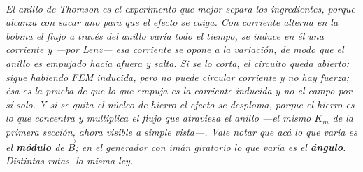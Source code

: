 \begin{center}
\begin{tikzpicture}[scale=1]
\end{tikzpicture}\\[0.5em]
{\small\itshape El anillo de Thomson es el experimento que mejor separa los
ingredientes, porque alcanza con sacar uno para que el efecto se caiga. Con
corriente alterna en la bobina el flujo a través del anillo varía todo el
tiempo, se induce en él una corriente y ---por Lenz--- esa corriente se opone a
la variación, de modo que el anillo es empujado hacia afuera y salta. Si se lo
corta, el circuito queda abierto: sigue habiendo FEM inducida, pero \emph{no
puede circular corriente} y no hay fuerza; ésa es la prueba de que lo que
empuja es la corriente inducida y no el campo por sí solo. Y si se quita el
núcleo de hierro el efecto se desploma, porque el hierro es lo que concentra y
multiplica el flujo que atraviesa el anillo ---el mismo $K_m$ de la primera
sección, ahora visible a simple vista---. Vale notar que acá lo que varía es el
\textbf{módulo} de $\vec B$; en el generador con imán giratorio lo que varía es
el \textbf{ángulo}. Distintas rutas, la misma ley.}
\end{center}
